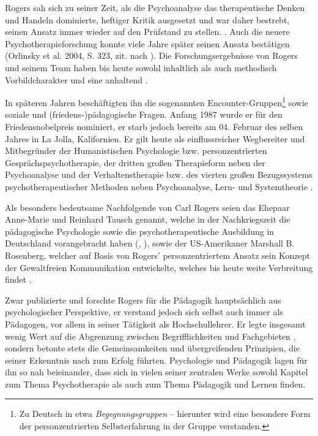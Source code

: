 \documentclass[
  twoside,
  parskip=half-,
  paper=176mm:246mm,
  BCOR=14mm,
  DIV=14,
]{scrreprt}
\begin{document}
Rogers sah sich zu seiner Zeit, als die Psychoanalyse das therapeutische Denken und Handeln dominierte, heftiger Kritik ausgesetzt und war daher bestrebt, seinen Ansatz immer wieder auf den Prüfstand zu stellen. . Auch die neuere Psychotherapieforschung konnte viele Jahre später seinen Ansatz bestätigen (Orlinsky et al. 2004, S. 323, zit. nach \cite[21]{weinberger}). Die Forschungsergebnisse von Rogers und seinem Team haben bis heute sowohl inhaltlich als auch methodisch Vorbildcharakter und eine anhaltend  \autocite[239]{kunze}.

In späteren Jahren beschäftigten ihn die sogenannten Encounter-Gruppen\footnote{Zu Deutsch in etwa \textit{Begegnungsgruppen} -- hierunter wird eine besondere Form der personzentrierten Selbsterfahrung in der Gruppe verstanden.} sowie soziale und (friedens-)pädagogische Fragen. Anfang 1987 wurde er für den Friedensnobelpreis nominiert, er starb jedoch bereits am 04. Februar des selben Jahres in La Jolla, Kalifornien. Er gilt heute als einflussreicher Wegbereiter und Mitbegründer der Humanistischen Psychologie bzw. personzentrierten Gesprächspsychotherapie, der dritten großen Therapieform neben der Psychoanalyse und der Verhaltenstherapie \autocite[vgl.][24]{weinberger} bzw. des vierten großen Bezugssystems psychotherapeutischer Methoden neben Psychoanalyse, Lern- und Systemtheorie \autocite[892]{integrativePsycho}.

Als besonders bedeutsame Nachfolgende von Carl Rogers seien das Ehepaar Anne-Marie und Reinhard Tausch genannt, welche in der Nachkriegszeit die pädagogische Psychologie sowie die psychotherapeutische Ausbildung in Deutschland vorangebracht haben (\cite[vgl.][31]{weinberger}, \cite[vgl.][58]{kunze}), sowie der US-Amerikaner Marshall B. Rosenberg, welcher auf Basis von Rogers' personzentriertem Ansatz sein Konzept der Gewaltfreien Kommunikation entwickelte, welches bis heute weite Verbreitung findet \autocite[vgl.][58]{kunze}.

Zwar publizierte und forschte Rogers für die Pädagogik hauptsächlich aus psychologischer Perspektive, er verstand jedoch sich selbst auch immer als Pädagogen, vor allem in seiner Tätigkeit als Hochschullehrer. Er legte insgesamt wenig Wert auf die Abgrenzung zwischen Begrifflichkeiten und Fachgebieten \autocite[vgl.][17]{rogers1942}, sondern betonte stets die Gemeinsamkeiten und übergreifenden Prinzipien, die seiner Erkenntnis nach zum Erfolg führten. Psychologie und Pädagogik lagen für ihn so nah beieinander, dass sich in vielen seiner zentralen Werke sowohl Kapitel zum Thema Psychotherapie als auch zum Thema Pädagogik und Lernen finden. 
\end{document}
